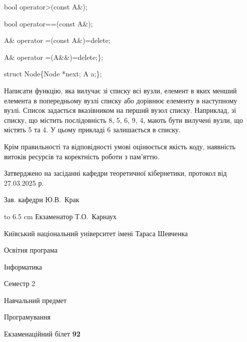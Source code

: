 \documentclass[12pt, ukrainian]{article}
\begin{document}
{\quad  bool operator>(const A\&); 

\quad  bool operator==(const A\&); 

\quad A\& operator =(const A\&)=delete; 

\quad  A\& operator =(A\&\&)=delete;\};

struct Node\{Node *next; A a;\};

 Написати функцію, яка вилучає зі списку всі вузли, елемент в яких менший елемента в попередньому вузлі списку або дорівнює елементу в наступному вузлі. Список задається вказівником на перший вузол списку. Наприклад, зі списку, що містить послідовність 8, 5, 6, 9, 4, мають бути вилучені вузли, що містять 5 та 4. У цьому прикладі 6 залишається в списку.

Крім правильності та відповідності умові оцінюється якість коду, наявність витоків ресурсів та коректність роботи з пам'яттю. 

}
{\smallskip\smallskip \begin {scriptsize} Затверджено на засіданні кафедри теоретичної кібернетики, протокол   від   27.03.2025 р.\par\smallskip\smallskip\smallskip\smallskip
{\parbox {6.5 cm} {Зав. кафедри \dotfill Ю.В.~Крак}}\hspace {0.7cm} {\hbox to 6.5 cm { Екзаменатор \dotfill Т.О.~Карнаух}} \end{scriptsize}}
\newpage
{{\begin {scriptsize}\par
{ \center  Київський національний університет імені Тараса Шевченка \par}
{\parbox {5 cm}{Освітня програма \hfill}{\parbox {7 cm}{Інформатика\hfill}}\parbox {6 cm}{\hfill Семестр 2}}\par
{\parbox {5 cm} {Навчальний предмет \hfill}\parbox {7 cm}{Програмування \hfill}\parbox {6cm}{\hfill}\par}\vspace{-15pt} \end{scriptsize}}{\center Екзаменаційний білет \No \textbf { 92 }\par}}
\end{document}
